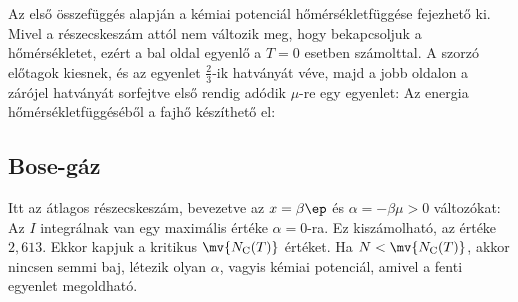     
    Az első összefüggés alapján a kémiai potenciál hőmérsékletfüggése fejezhető ki.
   Mivel a részecskeszám attól nem változik meg, hogy bekapcsoljuk a hőmérsékletet, ezért a bal oldal egyenlő a $T=0$ esetben számolttal.
   A szorzó előtagok kiesnek, és az egyenlet $\frac{2}{3}$-ik hatványát véve, majd a jobb oldalon a zárójel hatványát sorfejtve első rendig adódik $\mu$-re egy egyenlet:
    Az energia hőmérsékletfüggéséből a fajhő készíthető el:
  
  \subsection{Bose-gáz}
   
   Itt az átlagos részecskeszám, bevezetve az $x=\beta\ep$ és $\alpha=-\beta\mu>0$ változókat:
   Az $I$ integrálnak van egy maximális értéke $\alpha=0$-ra.
   Ez kiszámolható, az értéke $2,613$.
   Ekkor kapjuk a kritikus $\mv{N_\text{C}(T)}$ értéket.
   Ha $N<\mv{N_\text{C}(T)}$, akkor nincsen semmi baj, létezik olyan $\alpha$, vagyis kémiai potenciál, amivel a fenti egyenlet megoldható. 
   
